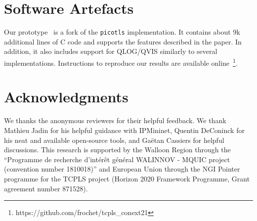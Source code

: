 %


\section*{Software Artefacts}

Our \tcpls prototype~\cite{frochet-github-picotcpls} is a fork of the
\texttt{picotls}  implementation.  It contains about 9k additional lines
of C code and supports the features described in the paper. In addition, it also
includes support for QLOG/QVIS \cite{marx2020debugging} similarly to several
\quic implementations. Instructions to reproduce our results are
available online~\footnote{https://github.com/frochet/tcpls\_conext21}.


\section*{Acknowledgments}

We thanks the anonymous reviewers for their helpful feedback. We thank Mathieu
Jadin for his helpful guidance with IPMininet, Quentin DeConinck for his neat
and available open-source tools, and Gaëtan Cassiers for helpful discussions.
This research is supported by the Walloon Region through the ``Programme de
recherche d'intérêt général WALINNOV - MQUIC project (convention number
1810018)'' and European Union through the NGI Pointer programme for the TCPLS
project (Horizon 2020 Framework Programme, Grant agreement number 871528).

